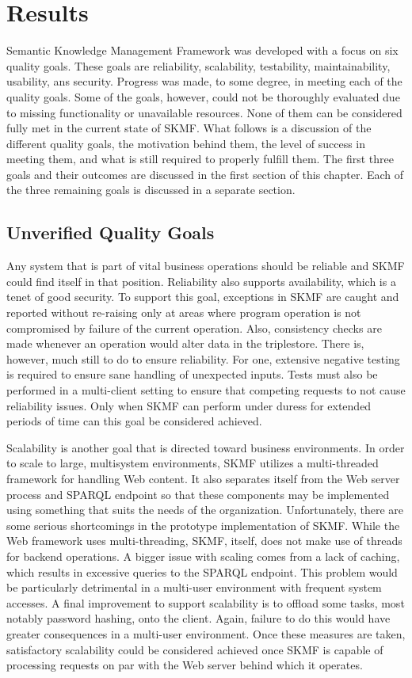 \chapter{Results}

Semantic Knowledge Management Framework was developed with a focus on six quality goals. These goals are reliability, scalability, testability, maintainability, usability, ans security. Progress was made, to some degree, in meeting each of the quality goals. Some of the goals, however, could not be thoroughly evaluated due to missing functionality or unavailable resources. None of them can be considered fully met in the current state of SKMF. What follows is a discussion of the different quality goals, the motivation behind them, the level of success in meeting them, and what is still required to properly fulfill them. The first three goals and their outcomes are discussed in the first section of this chapter. Each of the three remaining goals is discussed in a separate section.


\section{Unverified Quality Goals}

Any system that is part of vital business operations should be reliable and SKMF could find itself in that position. Reliability also supports availability, which is a tenet of good security. To support this goal, exceptions in SKMF are caught and reported without re-raising only at areas where program operation is not compromised by failure of the current operation. Also, consistency checks are made whenever an operation would alter data in the triplestore. There is, however, much still to do to ensure reliability. For one, extensive negative testing is required to ensure sane handling of unexpected inputs. Tests must also be performed in a multi-client setting to ensure that competing requests to not cause reliability issues. Only when SKMF can perform under duress for extended periods of time can this goal be considered achieved.

Scalability is another goal that is directed toward business environments. In order to scale to large, multisystem environments, SKMF utilizes a multi-threaded framework for handling Web content. It also separates itself from the Web server process and SPARQL endpoint so that these components may be implemented using something that suits the needs of the organization. Unfortunately, there are some serious shortcomings in the prototype implementation of SKMF. While the Web framework uses multi-threading, SKMF, itself, does not make use of threads for backend operations. A bigger issue with scaling comes from a lack of caching, which results in excessive queries to the SPARQL endpoint. This problem would be particularly detrimental in a multi-user environment with frequent system accesses. A final improvement to support scalability is to offload some tasks, most notably password hashing, onto the client. Again, failure to do this would have greater consequences in a multi-user environment. Once these measures are taken, satisfactory scalability could be considered achieved once SKMF is capable of processing requests on par with the Web server behind which it operates.

